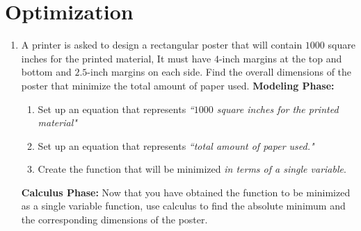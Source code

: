 \documentclass[10pt]{article}
\begin{document}
\pagestyle{otherpages}
\thispagestyle{firstpage}



\section{Optimization}
\begin{enumerate}[resume]
\item A printer is asked to design a rectangular poster that will contain $1000$ square inches for the printed material, It must have $4$-inch margins at the top and bottom and $2.5$-inch margins on each side. Find the overall dimensions of the poster that minimize the total amount of paper used.
\textbf{Modeling Phase:}
\begin{enumerate}
    \item Set up an equation that represents {\em ``$1000$ square inches for the printed material"}
    \item Set up an equation that represents {\em ``total amount of paper used."}    
    \item Create the function that will be minimized {\em in terms of a single variable}.
\end{enumerate}
\textbf{Calculus Phase:}
Now that you have obtained the function to be minimized as a single variable function, use calculus to find the absolute minimum  and the corresponding dimensions of the poster.



\end{enumerate}
\newpage
\end{document}
